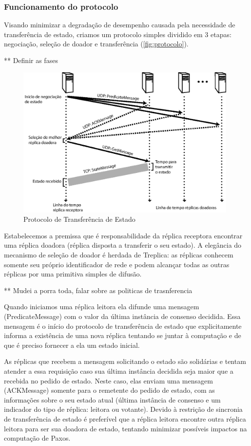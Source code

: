 \subsubsection{Funcionamento do protocolo}

Visando minimizar a degradação de desempenho causada pela necessidade de transferência de
estado, criamos um protocolo simples dividido em 3 etapas: negociação, seleção de doador e
transferência (\autoref{fig:protocolo}).

** Definir as fases

\begin{figure}[ht]
  \centering
  \includegraphics[width=11cm]{conteudo/capitulos/figuras/transferencia_estado.eps}
  \caption{Protocolo de Transferência de Estado}
  \label{fig:protocolo}
\end{figure}

Estabelecemos a premissa que é responsabilidade da réplica receptora encontrar uma réplica
doadora (réplica disposta a transferir o seu estado). A elegância do mecanismo de seleção
de doador é herdada de Treplica: as réplicas conhecem somente seu próprio identificador de
rede e podem alcançar todas as outras réplicas por uma primitiva simples de difusão.

** Mudei a porra toda, falar sobre as politicas de trasnferencia

Quando iniciamos uma réplica leitora ela difunde uma mensagem (PredicateMessage) com o valor da
última instância de consenso decidida. Essa mensagem é o início do protocolo de
transferência de estado que explicitamente informa a existência de uma nova réplica
tentando se juntar à computação e de que é preciso fornecer a ela um estado inicial.

As réplicas que recebem a mensagem solicitando o estado são solidárias e tentam atender a
essa requisição caso sua última instância decidida seja maior que a recebida no pedido de
estado. Neste caso, elas enviam uma mensagem (ACKMessage) somente para o remetente
do pedido de estado, com as informações sobre o seu estado atual (última instância de
consenso e um indicador do tipo de réplica: leitora ou votante). Devido à restrição de
sincronia de transferência de estado é preferível que a réplica leitora encontre outra
réplica leitora para ser sua doadora de estado, tentando minimizar possíveis impactos na
computação de Paxos.

